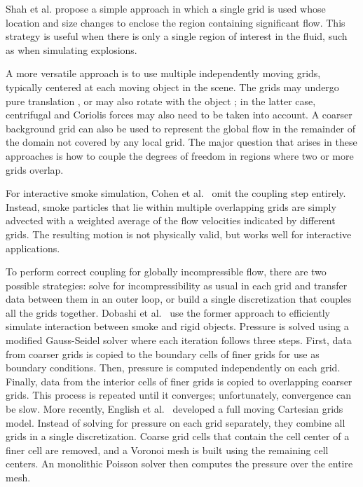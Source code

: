 Shah et al. \cite{Shah2004} propose a simple approach in which a single grid is used whose location and size changes to enclose the region containing significant flow.
This strategy is useful when there is only a single region of interest in the fluid, such as when simulating explosions.

A more versatile approach is to use multiple independently moving grids, typically centered at each moving object in the scene.
The grids may undergo pure translation \cite{Cohen2010}, or may also rotate with the object \cite{Dobashi2008:adaptiveGrid,English2013}; in the latter case, centrifugal and Coriolis forces may also need to be taken into account.
A coarser background grid can also be used to represent the global flow in the remainder of the domain not covered by any local grid.
The major question that arises in these approaches is how to couple the degrees of freedom in regions where two or more grids overlap.

For interactive smoke simulation, Cohen et al.~\cite{Cohen2010} omit the coupling step entirely.
Instead, smoke particles that lie within multiple overlapping grids are simply advected with a weighted average of the flow velocities indicated by different grids.
The resulting motion is not physically valid, but works well for interactive applications.

To perform correct coupling for globally incompressible flow, there are two possible strategies: solve for incompressibility as usual in each grid and transfer data between them in an outer loop, or build a single discretization that couples all the grids together.
Dobashi et al.~\cite{Dobashi2008:adaptiveGrid} use the former approach to efficiently simulate interaction between smoke and rigid objects. Pressure is solved using a modified Gauss-Seidel solver where each iteration follows three steps.
First, data from coarser grids is copied to the boundary cells of finer grids for use as boundary conditions.
Then, pressure is computed independently on each grid.
Finally, data from the interior cells of finer grids is copied to overlapping coarser grids.
This process is repeated until it converges; unfortunately, convergence can be slow.
More recently, English et al.~\cite{English2013} developed a full moving Cartesian grids model.
Instead of solving for pressure on each grid separately, they combine all grids in a single discretization.
Coarse grid cells that contain the cell center of a finer cell are removed, and a Voronoi mesh is built using the remaining cell centers.
An monolithic Poisson solver then computes the pressure over the entire mesh.

